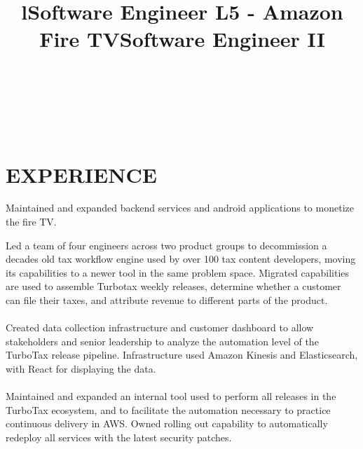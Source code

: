\documentclass[margin]{res}
\begin{document}
\begin{resume}

\begin{format}
\title{l}\\
\\
\body\\
\end{format}

\section{EXPERIENCE}

\title{\textbf{Software Engineer L5 - Amazon Fire TV}}
\begin{position}
Maintained and expanded backend services and android applications to monetize the fire TV.
\end{position}

\title{\textbf{Software Engineer II}}
\begin{position}
Led a team of four engineers across two product groups to decommission a decades old tax workflow engine used by over 100 tax content developers, moving its capabilities to a newer tool in the same problem space. Migrated capabilities are used to assemble Turbotax weekly releases, determine whether a customer can file their taxes, and attribute revenue to different parts of the product.
\\
\\
Created data collection infrastructure and customer dashboard to allow stakeholders and senior leadership to analyze the automation level of the TurboTax release pipeline. Infrastructure used Amazon Kinesis and Elasticsearch, with React for displaying the data.
\\
\\
Maintained and expanded an internal tool used to perform all releases in the TurboTax ecosystem, and to facilitate the automation necessary to practice continuous delivery in AWS. Owned rolling out capability to automatically redeploy all services with the latest security patches.
\end{position}


\end{resume}
\end{document}
